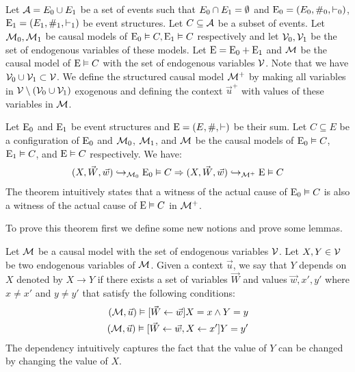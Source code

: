 \begin{definition}
    Let $\mathcal{A} = E_0 \cup E_1$ be a set of events such that
    $E_0 \cap E_1 = \emptyset$ and $\mathrm{E}_0 = (E_0,\#_0,\vdash_0)$,
    $\mathrm{E}_1 = (E_1,\#_1,\vdash_1)$ be event structures.
    Let $C \subseteq \mathcal{A}$ be a subset of events.
    Let $\mathcal{M}_0,\mathcal{M}_1$ be causal models of $\mathrm{E}_0 \vDash C,\mathrm{E}_1 \vDash C$
    respectively and let $\mathcal{V}_0,\mathcal{V}_1$ be the set of endogenous
    variables of these models.
    Let $\mathrm{E} = \mathrm{E}_0 + \mathrm{E}_1$ and $\mathcal{M}$ be the causal model of
    $\mathrm{E} \vDash C$ with the set of endogenous variables $\mathcal{V}$.
    Note that we have $\mathcal{V}_0 \cup \mathcal{V}_1 \subset \mathcal{V}$.
    We define the structured causal model $\mathcal{M}^+$ by making all variables
    in $\mathcal{V}\setminus (\mathcal{V}_0 \cup \mathcal{V}_1)$ exogenous and
    defining the context $\vec u^+$ with values of these variables in
    $\mathcal{M}$.
\end{definition}

\begin{theorem}
    Let $\mathrm{E}_0$ and $\mathrm{E}_1$ be event structures and
    $\mathrm{E} = (E,\#,\vdash)$ be their sum.
    Let $C \subseteq E$ be a configuration of $\mathrm{E}_0$
    and $\mathcal{M}_0$, $\mathcal{M}_1$, and $\mathcal{M}$ be the causal models
    of $\mathrm{E}_0 \vDash C$,$\mathrm{E}_1 \vDash C$, and $\mathrm{E} \vDash C$ respectively.
    We have:
    \begin{align*}
        (X,\vec W,\vec w) \hookrightarrow_{\mathcal{M}_0} \mathrm{E}_0 \vDash C
        \Rightarrow (X,\vec W,\vec w) \hookrightarrow_{\mathcal{M}^+} \mathrm{E} \vDash C
    \end{align*}
    The theorem intuitively states that a witness of the actual cause
    of $\mathrm{E}_0 \vDash C$ is also a witness of the actual cause of
    $\mathrm{E} \vDash C$ in $\mathcal{M}^+$.
\end{theorem}

To prove this theorem first we define some new notions and prove some lemmas.

\begin{notion}
    Let $\mathcal{M}$ be a causal model with the set of endogenous variables $\mathcal{V}$.
    Let $X,Y \in \mathcal{V}$ be two endogenous variables of $\mathcal{M}$.
    Given a context $\vec u$, we say that $Y$ depends on $X$ denoted by
    $X \to Y$ if there exists a set of variables $\vec W$ and values
    $\vec w, x', y'$ where $x \neq x'$ and $y \neq y'$ that satisfy the
    following conditions:
    \begin{align*}
        (\mathcal{M},\vec u) \vDash[\vec W \leftarrow \vec w] X = x \wedge Y = y \\
        (\mathcal{M},\vec u) \vDash[\vec W \leftarrow \vec w, X \leftarrow x'] Y = y'
    \end{align*}
    The dependency intuitively captures the fact that the value of $Y$
    can be changed by changing the value of $X$.
\end{notion}

